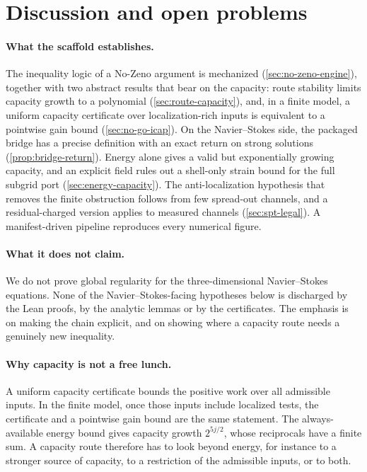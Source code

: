 \section{Discussion and open problems}\label{sec:discussion}

\paragraph{What the scaffold establishes.}
The inequality logic of a No-Zeno argument is mechanized
(\cref{sec:no-zeno-engine}), together with two abstract results that bear on the capacity: route
stability limits capacity growth to a polynomial (\cref{sec:route-capacity}), and, in a finite model,
a uniform capacity certificate over localization-rich inputs is equivalent to a pointwise gain bound
(\cref{sec:no-go-icap}). On the Navier--Stokes side, the packaged bridge has a precise definition
with an exact return on strong solutions (\cref{prop:bridge-return}). Energy alone gives a valid but
exponentially growing capacity, and an explicit field rules out a shell-only strain bound for the
full subgrid port (\cref{sec:energy-capacity}). The anti-localization hypothesis that removes the
finite obstruction follows from few spread-out channels, and a residual-charged version applies to
measured channels (\cref{sec:spt-legal}). A manifest-driven pipeline reproduces every numerical figure.

\paragraph{What it does not claim.}
We do not prove global regularity for the three-dimensional Navier--Stokes equations. None of the
Navier--Stokes-facing hypotheses below is discharged by the Lean proofs, by the analytic lemmas or by
the certificates. The emphasis is on making the chain explicit, and on showing where a capacity
route needs a genuinely new inequality.

\paragraph{Why capacity is not a free lunch.}
A uniform capacity certificate bounds the positive work over all admissible inputs. In the finite
model, once those inputs include localized tests, the certificate and a pointwise gain bound are the
same statement. The always-available energy bound gives capacity growth $2^{5j/2}$, whose reciprocals
have a finite sum. A capacity route therefore has to look beyond energy, for instance to a stronger source of
capacity, to a restriction of the admissible inputs, or to both.

